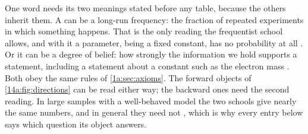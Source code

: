 One word needs its two meanings stated before any table, because the others inherit
them. A  can be a long-run frequency: the fraction of repeated
experiments in which something happens. That is the only reading the frequentist
school allows, and with it a parameter, being a fixed constant, has no probability at
all . Or it can be a degree of belief: how strongly the information we
hold supports a statement, including a statement about a constant such as the
electron mass . Both obey the same rules of
\cref{1a:sec:axioms}. The forward objects of \cref{14a:fig:directions} can be read
either way; the backward ones need the second reading. In large samples with a
well-behaved model the two schools give nearly the same numbers, and in general they
need not , which is why every entry below says which question its
object answers.

